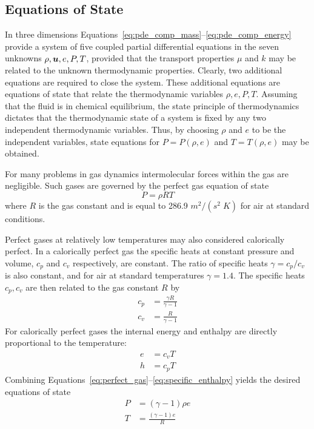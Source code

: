 \subsection{Equations of State}
In three dimensions Equations~\eqref{eq:pde_comp_mass}--\eqref{eq:pde_comp_energy} provide a system of five coupled partial differential equations in the seven unknowns $\rho, {\boldsymbol{u}}, e, P, T$, provided that the transport properties $\mu$ and $k$ may be related to the unknown thermodynamic properties.  Clearly, two additional equations are required to close the system.  These additional equations are equations of state that relate the thermodynamic variables $\rho, e, P, T$.  Assuming that the fluid is in chemical equilibrium, the state principle of thermodynamics dictates that the thermodynamic state of a system is fixed by any two independent thermodynamic variables.  Thus, by choosing $\rho$ and $e$ to be the independent variables, state equations for $P=P(\rho,e)$ and $T=T(\rho,e)$ may be obtained. 

For many problems in gas dynamics intermolecular forces within the gas are negligible.  Such gases are governed by the perfect gas equation of state
\begin{equation}
  \label{eq:perfect_gas}
  P = \rho R T
\end{equation}
where $R$ is the gas constant and is equal to 286.9 $m^2/(s^2\;K)$ for air at standard conditions.

Perfect gases at relatively low temperatures may also considered calorically perfect.  In a calorically perfect gas the specific heats at constant pressure and volume, $c_p$ and $c_v$ respectively, are constant.  The ratio of specific heats $\gamma = c_p/c_v$ is also constant, and for air at standard temperatures $\gamma=1.4$.  The specific heats $c_p, c_v$ are then related to the gas constant $R$ by
\begin{align}
  \label{eq:cp}
  c_p &= \frac{\gamma R}{\gamma - 1} \\
  \label{eq:cv}
   c_v &= \frac{R}{\gamma - 1}
\end{align}
For calorically perfect gases the internal energy and enthalpy are directly proportional to the temperature:
\begin{align}
  \label{eq:internal_energy}
  e &= c_v T \\
  \label{eq:specific_enthalpy}
  h &= c_p T
\end{align}
Combining Equations~\eqref{eq:perfect_gas}--\eqref{eq:specific_enthalpy} yields the desired equations of state
\begin{align}
  \label{eq:p_eq_state}
  P &= \left(\gamma - 1\right) \rho e \\
  \label{eq:t_eq_state}
  T &= \frac{\left(\gamma - 1\right)e}{R}
\end{align}

